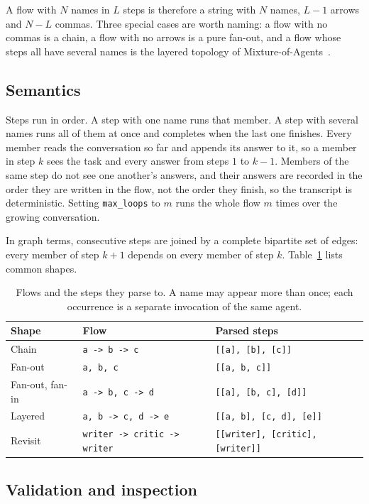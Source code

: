 \documentclass[11pt]{article}
\newcommand{\code}[1]{\texttt{#1}}
\begin{document}
\noindent A flow with $N$ names in $L$ steps is therefore a string with $N$ names, $L-1$ arrows and $N-L$ commas. Three special cases are worth naming: a flow with no commas is a chain, a flow with no arrows is a pure fan-out, and a flow whose steps all have several names is the layered topology of Mixture-of-Agents~\cite{moa}.

\subsection{Semantics}

Steps run in order. A step with one name runs that member. A step with several names runs all of them at once and completes when the last one finishes. Every member reads the conversation so far and appends its answer to it, so a member in step $k$ sees the task and every answer from steps $1$ to $k-1$. Members of the same step do not see one another's answers, and their answers are recorded in the order they are written in the flow, not the order they finish, so the transcript is deterministic. Setting \code{max\_loops} to $m$ runs the whole flow $m$ times over the growing conversation.

In graph terms, consecutive steps are joined by a complete bipartite set of edges: every member of step $k+1$ depends on every member of step $k$. Table~\ref{tab:flows} lists common shapes.

\begin{table}[ht]
\centering
\small
\begin{tabular}{@{}lll@{}}
\toprule
Shape & Flow & Parsed steps \\
\midrule
Chain & \code{a -> b -> c} & \code{[[a], [b], [c]]} \\
Fan-out & \code{a, b, c} & \code{[[a, b, c]]} \\
Fan-out, fan-in & \code{a -> b, c -> d} & \code{[[a], [b, c], [d]]} \\
Layered & \code{a, b -> c, d -> e} & \code{[[a, b], [c, d], [e]]} \\
Revisit & \code{writer -> critic -> writer} & \code{[[writer], [critic], [writer]]} \\
\bottomrule
\end{tabular}
\caption{Flows and the steps they parse to. A name may appear more than once; each occurrence is a separate invocation of the same agent.}
\label{tab:flows}
\end{table}

\subsection{Validation and inspection}
\end{document}
